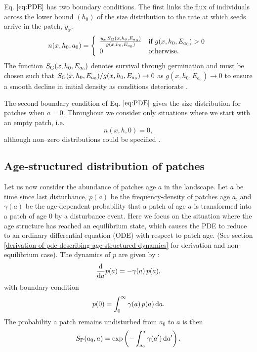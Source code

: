 \documentclass[10pt,twoside]{article}
\begin{document}
Eq. \(\ref{eq:PDE}\) has two boundary conditions. The first links the
flux of individuals across the lower bound \((h_0)\) of the size
distribution to the rate at which seeds arrive in the patch, \(y_x\):
\begin{equation} \label{eq:BC1}
  n(x,h_0,a_0)  = \left\{
  \begin{array}{ll}   \frac{y_x  \, S_{\rm G} (x, h_0, E_{a_0}) }{ g(x,h_0, E_{a_0}) }  & \textrm{if } g(x,h_0, E_{a_0}) > 0 \\
  0 & \textrm{otherwise.}
  \end{array} \right.
\end{equation}
The function \(S_{\rm G} (x, h_0, E_{a_0})\) denotes survival through
germination and must be chosen such that
\(S_{\rm G} (x, h_0, E_{a_0}) / g(x,h_0, E_{a_0}) \rightarrow 0\) as
\(g(x,h_0, E_{a_0}) \rightarrow 0\) to ensure a smooth decline in
initial density as conditions deteriorate \citep{Falster-2011}.

The second boundary condition of Eq. \(\ref{eq:PDE}\) gives the size
distribution for patches when \(a=0\). Throughout we consider only
situations where we start with an empty patch, i.e.
\begin{equation} \label{eq:BC2} n\left(x,h,0\right) =0,
\end{equation}
although non--zero distributions could be specified
\citep[e.g][]{Moorcroft-2001}.

\subsection{Age-structured distribution of
patches}\label{age-structured-distribution-of-patches}

Let us now consider the abundance of patches age \(a\) in the landscape.
Let \(a\) be time since last disturbance, \(p(a)\) be the
frequency-density of patches age \(a\), and \(\gamma(a)\) be the
age-dependent probability that a patch of age \(a\) is transformed into
a patch of age 0 by a disturbance event. Here we focus on the situation
where the age structure has reached an equilibrium state, which causes
the PDE to reduce to an ordinary differential equation (ODE) with
respect to patch age. (See section
\ref{derivation-of-pde-describing-age-structured-dynamics} for derivation and
non-equilibrium case). The dynamics of \(p\) are given by
\citep{Vonfoerster-1959, Mckendrick-1926}:
\begin{equation} \label{eq:agepde}
\frac{{\rm d}}{{\rm d} a} p(a)  = -\gamma(a) \, p(a) ,
\end{equation}
with boundary condition
\begin{equation}  p(0)  = \int_0^\infty \gamma(a) \, p(a) \, {\rm d} a.
\end{equation}
The probability a patch remains undisturbed from \(a_0\) to \(a\) is
then
\begin{equation} \label{eq:survivalPatch}
  S_{\rm P} (a_0,a) = \exp\left(-\int_{a_0}^{a} \gamma(a^\prime) \, {\rm d} a^\prime \right).
\end{equation}
\end{document}
